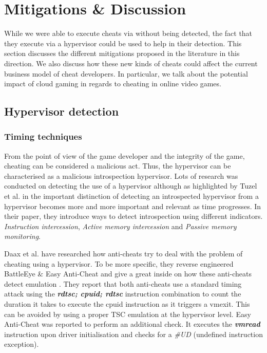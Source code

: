 
\section{Mitigations \& Discussion}
\label{sec:discussion}


While we were able to execute cheats via \frameworkName without being detected, the fact that they execute via a hypervisor could be used to help in their detection. This section discusses the different mitigations proposed in the literature in this direction. We also discuss how these new kinds of cheats could affect the current business model of cheat developers. In particular, we talk about the potential impact of cloud gaming in regards to cheating in online video games.

\subsection{Hypervisor detection}


\subsubsection{\textbf{Timing techniques}}
From the point of view of the game developer and the integrity of the game, cheating can be considered a malicious act. Thus, the hypervisor can be characterised as a malicious introspection hypervisor. Lots of research was conducted on detecting the use of a hypervisor although as highlighted by Tuzel et al. in \cite{whoWatchesTheWatcher} the important distinction of detecting an introspected hypervisor from a hypervisor becomes more and more important and relevant as time progresses. In their paper, they introduce ways to detect introspection using different indicators. \textit{Instruction intercession}, \textit{Active memory intercession} and \textit{Passive memory monitoring}. 

Daax et al. have researched how anti-cheats try to deal with the problem of cheating using a hypervisor. To be more specific, they reverse engineered BattleEye \& Easy Anti-Cheat and give a great inside on how these anti-cheats detect emulation \cite{DaaxAntiCheatEmulation}. They report that both anti-cheats use a standard timing attack using the \textbf{\textit{rdtsc; cpuid; rdtsc}} instruction combination to count the duration it takes to execute the cpuid instruction as it triggers a vmexit. This can be avoided by using a proper TSC emulation at the hypervisor level. Easy Anti-Cheat was reported to perform an additional check. 
 It executes the  \textit{\textbf{vmread}} instruction upon driver initialisation and checks for a \textit{\#UD} (undefined instruction exception).
 
